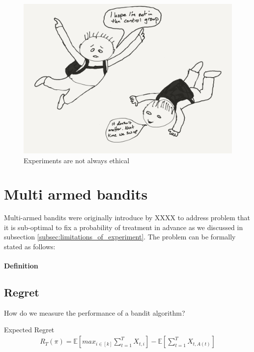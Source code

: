 \documentclass[11pt,a4paper,oneside]{book}
\newcommand{\simpleregret}{R_T}
\newcommand{\E}[1]{\mathbb E\left[{#1}\right]}
\newcommand{\eqn}[1]{\begin{align}#1\end{align}}
\begin{document}
\begin{figure}[h]
\begin{center}
\caption{Experiments are not always ethical}
\includegraphics[scale=.4]{double_blind_parashute_trial_cartoon.png}
\end{center}
\end{figure}



\section*{Multi armed bandits}

Multi-armed bandits were originally introduce by XXXX to address problem that it is sub-optimal to fix a probability of treatment in advance as we discussed in subsection \ref{subsec:limitations_of_experiment}. The problem can be formally stated as follows:


\paragraph*{Definition} 


\subsection*{Regret} How do we measure the performance of a bandit algorithm?


Expected Regret
\eqn{
R_T(\pi) = \E{max_{i \in [k]} \sum_{t=1}^T{X_{t,i}}} - \E{\sum_{t=1}^T{X_{t,A(t)}}}
}
\end{document}
